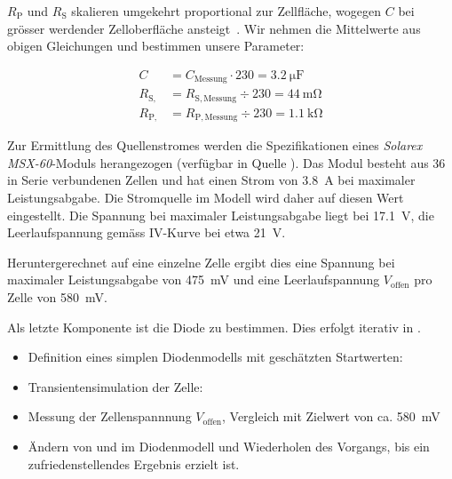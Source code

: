 $R_{\mathrm{P}}$   und  $R_{\mathrm{S}}$   skalieren  umgekehrt   proportional
zur  Zellfl\"ache,  wogegen  $C$   bei  gr\"osser  werdender  Zelloberfl\"ache
ansteigt~\cite{ref:solar:scofield}. Wir  nehmen  die  Mittelwerte  aus  obigen
Gleichungen und bestimmen unsere Parameter:

\begin{align}
    C               &= C_{\mathrm{Messung}}    \cdot 230 = \SI{3.2}{\micro\farad} \\
    R_{\mathrm{S,}} &= R_{\mathrm{S, Messung}} \div  230 = \SI{44}{\milli\ohm}    \\
    R_{\mathrm{P,}} &= R_{\mathrm{P, Messung}} \div  230 = \SI{1.1}{\kilo\ohm}
\end{align}

Zur   Ermittlung  des   Quellenstromes   werden   die  Spezifikationen   eines
\emph{Solarex    MSX-60}-Moduls    herangezogen   (verf\"ugbar    in    Quelle
\cite{ref:solar:bonkoungou}). Das Modul  besteht aus  36 in  Serie verbundenen
Zellen und hat  einen Strom von 
\SI{3.8}{\ampere}  bei maximaler  Leistungsabgabe. Die  Stromquelle im  Modell
wird daher auf diesen Wert eingestellt.
Die  Spannung  bei   maximaler  Leistungsabgabe  liegt  bei
\SI{17.1}{\volt}, die
Leerlaufspannung gem\"ass IV-Kurve bei etwa \SI{21}{\volt}.

Heruntergerechnet  auf  eine einzelne  Zelle  ergibt  dies eine  Spannung  bei
maximaler Leistungsabgabe von  \SI{475}{\milli\volt} und eine Leerlaufspannung
$V_{\mathrm{offen}}$ pro Zelle von \SI{580}{\milli\volt}.

Als letzte  Komponente ist  die Diode zu  bestimmen. Dies erfolgt  iterativ in
.

\begin{itemize}
    \item
        Definition eines simplen  Diodenmodells mit gesch\"atzten Startwerten: \\
    \item
        Transientensimulation der Zelle: 
    \item
        Messung  der   Zellenspannnung  $V_{\mathrm{offen}}$,   Vergleich  mit
        Zielwert von ca. \SI{580}{\milli\volt}
    \item
        \"Andern von   und   im Diodenmodell  und Wiederholen
        des Vorgangs, bis ein zufriedenstellendes Ergebnis erzielt ist.
\end{itemize}

